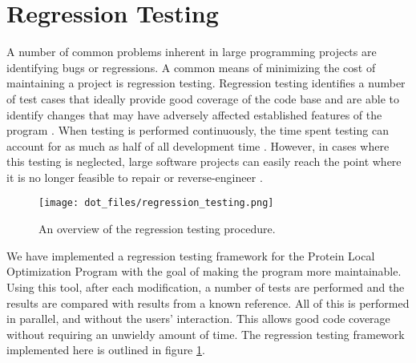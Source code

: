 \section{Regression Testing}
\label{section:unsorted/regression_testing}
A number of common problems inherent in large programming projects are identifying bugs or regressions. 
A common means of minimizing the cost of maintaining a project is regression testing.
Regression testing identifies a number of test cases that ideally provide good coverage of the code base and are able to identify changes that may have adversely affected established features of the program \cite{wong1997study}.
When testing is performed continuously, the time spent testing can account for as much as half of all development time \cite{leung1989insights}.
However, in cases where this testing is neglected, large software projects can easily reach the point where it is no longer feasible to repair or reverse-engineer \cite{weide1995reverse}.

\begin{figure}[h]
\centering
\texttt{[image: dot\_files/regression\_testing.png]}
\caption{An overview of the regression testing procedure.}
\label{figure:regression_testing_flowchart}
\end{figure}

We have implemented a regression testing framework for the Protein Local Optimization Program with the goal of making the program more maintainable.
Using this tool, after each modification, a number of tests are performed and the results are compared with results from a known reference.
All of this is performed in parallel, and without the users' interaction.
This allows good code coverage without requiring an unwieldy amount of time.
The regression testing framework implemented here is outlined in figure \ref{figure:regression_testing_flowchart}.

